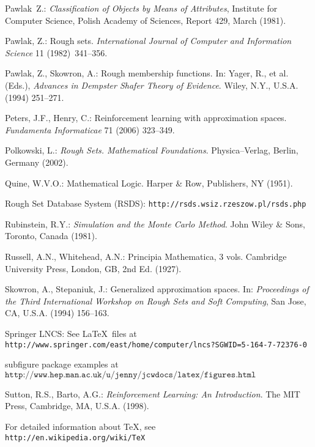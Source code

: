 \documentclass{llncs}
\begin{document}
\begin{thebibliography}{99}
 Pawlak~Z.:
{\em Classification of Objects by Means of Attributes},
Institute for Computer Science, Polish Academy of Sciences, Report 429, March (1981).

 Pawlak, Z.: Rough sets. {\it International Journal of Computer and Information Science} 11 (1982)~341--356.

 Pawlak, Z., Skowron, A.: Rough membership functions.  In: Yager, R., et al. (Eds.), \emph{Advances in Dempster Shafer Theory of Evidence}.  Wiley, N.Y., U.S.A. (1994) 251--271.

 Peters, J.F., Henry, C.: Reinforcement learning with approximation spaces. {\it Fundamenta Informaticae} 71 (2006) 323--349.

 Polkowski, L.:
\emph{Rough Sets. Mathematical Foundations}. Physica--Verlag, Berlin, Germany (2002).

 Quine, W.V.O.: Mathematical Logic. Harper \& Row, Publishers, NY (1951).

 Rough Set Database System (RSDS): \texttt{http://rsds.wsiz.rzeszow.pl/rsds.php}

 Rubinstein, R.Y.: \emph{Simulation and the Monte Carlo Method}.  John Wiley \& Sons, Toronto, Canada (1981).

 Russell, A.N., Whitehead, A.N.: Principia Mathematica, 3 vols.  Cambridge University Press, London, GB, 2nd Ed. (1927).

 Skowron, A., Stepaniuk, J.: Generalized approximation spaces. In: \emph{Proceedings of the Third International Workshop on Rough Sets and Soft Computing}, San Jose, CA, U.S.A. (1994) 156--163.

 Springer LNCS: See \LaTeX~files at\\ \texttt{http://www.springer.com/east/home/computer/lncs?SGWID=5-164-7-72376-0}

 subfigure package examples at\\
$\texttt{http://www.hep.man.ac.uk/u/jenny/jcwdocs/latex/figures.html}$

 Sutton, R.S., Barto, A.G.:  \emph{Reinforcement Learning: An Introduction}.  The MIT Press, Cambridge, MA, U.S.A. (1998).

 For detailed information about \TeX, see\\
\texttt{http://en.wikipedia.org/wiki/TeX}


\end{thebibliography}
\end{document}
